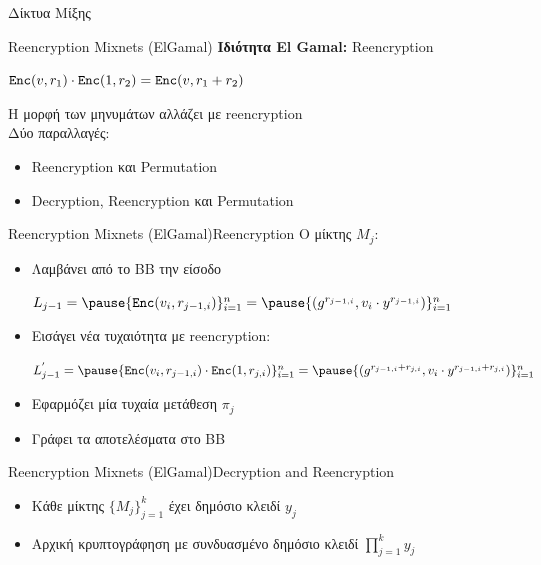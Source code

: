 \documentclass[handout]{beamer}
\begin{document}
\begin{section}{Δίκτυα Μίξης}
\begin{frame}{Reencryption Mixnets (ElGamal)}
   \textbf{Ιδιότητα El Gamal:} Reencryption
   \begin{center}
    $\mathtt{Enc}(v, r_1) \cdot \mathtt{Enc}(1, r_2) = \mathtt{Enc}(v,r_1+r_2)$
   \end{center} \pause 
    Η μορφή των μηνυμάτων αλλάζει με reencryption \\
    Δύο παραλλαγές:
    \begin{itemize}
        \item Reencryption και Permutation  \pause

        \item Decryption, Reencryption και Permutation 
    \end{itemize} 
\end{frame}

\begin{frame}{Reencryption Mixnets (ElGamal)}{Reencryption}
        Ο μίκτης $M_j$:
        \begin{itemize}
            \item Λαμβάνει από το ΒΒ την είσοδο 
            \begin{center} $L_{j-1} = \pause \{ \enc(v_i,r_{j-1,i}) \}_{i=1}^n = \pause \{ (g^{r_{j-1,i}}, v_i \cdot y^{r_{j-1,i}}) \}_{i=1}^n$  \end{center} \pause
            \item Εισάγει νέα τυχαιότητα με reencryption:
            \begin{center}$L_{j-1}^{'} =  \pause  \{ \enc(v_i,r_{j-1,i}) \cdot \enc(1, r_{j,i})  \}_{i=1}^n = \pause
    	        \{ (g^{r_{j-1,i}+r_{j,i}}, v_i \cdot y^{r_{j-1,i}+r_{j,i}}) \}_{i=1}^n $  
            \end{center} \pause
            \item Εφαρμόζει μία τυχαία μετάθεση $\pi_j$ \pause
            \item Γράφει τα αποτελέσματα στο BB
        \end{itemize}  
 \end{frame}
 
 \begin{frame}{Reencryption Mixnets (ElGamal)}{Decryption and Reencryption}
   \begin{itemize}  
        
        \item Κάθε μίκτης $\{ M_j \}_{j=1}^k$ έχει δημόσιο κλειδί $y_j$ 
        \item Αρχική κρυπτογράφηση με συνδυασμένο δημόσιο κλειδί \pause  $\prod_{j=1}^k y_j$ \pause
        

\end{itemize}
\end{frame}
\end{section}
\end{document}
